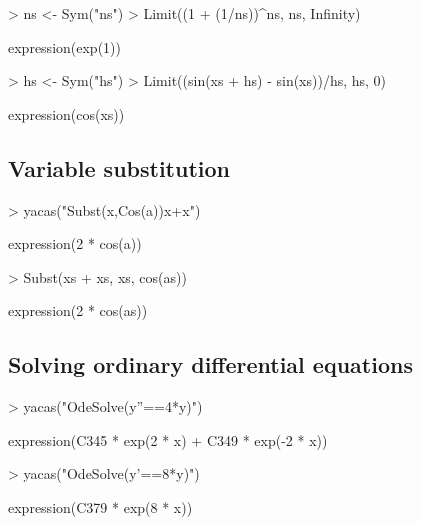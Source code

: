 \documentclass[]{article}
\begin{document}
\begin{Schunk}
\begin{Sinput}
> ns <- Sym("ns")
> Limit((1 + (1/ns))^ns, ns, Infinity)
\end{Sinput}
\begin{Soutput}
expression(exp(1))
\end{Soutput}
\begin{Sinput}
> hs <- Sym("hs")
> Limit((sin(xs + hs) - sin(xs))/hs, hs, 0)
\end{Sinput}
\begin{Soutput}
expression(cos(xs))
\end{Soutput}
\end{Schunk}

\subsection{Variable substitution}

\begin{Schunk}
\begin{Sinput}
> yacas("Subst(x,Cos(a))x+x")
\end{Sinput}
\begin{Soutput}
expression(2 * cos(a))
\end{Soutput}
\end{Schunk}

\begin{Schunk}
\begin{Sinput}
> Subst(xs + xs, xs, cos(as))
\end{Sinput}
\begin{Soutput}
expression(2 * cos(as))
\end{Soutput}
\end{Schunk}

\subsection{Solving ordinary differential equations}

\begin{Schunk}
\begin{Sinput}
> yacas("OdeSolve(y''==4*y)")
\end{Sinput}
\begin{Soutput}
expression(C345 * exp(2 * x) + C349 * exp(-2 * x))
\end{Soutput}
\begin{Sinput}
> yacas("OdeSolve(y'==8*y)")
\end{Sinput}
\begin{Soutput}
expression(C379 * exp(8 * x))
\end{Soutput}
\end{Schunk}
\end{document}
